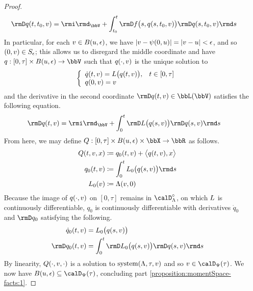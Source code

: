 \begin{proof}
\begin{align*}
    \Der q(t,t_0,\vecVar) 
    &= \id_\vecSpace + \int_{t_0}^t \Der f\big(s, q(s,t_0,\vecVar) \big) \Der q(s, t_0, \vecVar) \rmd s
  \end{align*}
  In particular, for each $v \in B(u, \epsilon)$, we have $|v - \psi(0,u)| = |v - u| < \epsilon$, and so $(0,v) \in S_\epsilon$; this allows us to disregard the middle coordinate and have $q: [0,\tau] \times B(\momentVar,\epsilon) \rightarrow \vecSpace$ such that $q(\cdot,v)$ is the unique solution to 
  \begin{equation*}
    \left\{\begin{array}{ll}
      \dot q(t, v) = L\big(q(t, v)\big), & t \in [0,\tau] \\
      q(0, v) = v
    \end{array}\right.
  \end{equation*}
  and the derivative in the second coordinate $\Der q(t,\vecVar) \in \bbL(\vecSpace)$ satisfies the following equation.
  \begin{align*}
    \Der q(t,\vecVar) &= \id_\vecSpace + \int_0^t \Der\odePart\big(q(s,\vecVar)\big)\Der q(s, \vecVar) \rmd s
  \end{align*}
  From here, we may define $Q: [0,\tau] \times B(\momentVar,\epsilon) \times \stateSpace \rightarrow \bbR$ as follows.
  \begin{align*}
    Q(t,\vecVar,\stateVar) &\defeq q_0(t,\vecVar) + \bprj{q(t,\vecVar)}{\stateVar} \\
    q_0(t,\vecVar) &\defeq \int_0^t \odePart_0\big(q(s,\vecVar)\big) \rmd s \\
    \odePart_0(\vecVar) &\defeq \ode(\vecVar, 0)
  \end{align*}
  Because the image of $q(\cdot, v)$ on $[0,\tau]$ remains in $\odeSpace^\circ$, on which $L$ is continuously differentiable, $q_0$ is continuously differentiable with derivatives $\dot q_0$ and $\Der q_0$ satisfying the following.
  \begin{align*}
    \dot q_0(t,\vecVar) &= \odePart_0\big(q(s,\vecVar)\big) \\
    \Der q_0(t, \vecVar) &= \int_0^t \Der\odePart_0\big( q(s, \vecVar) \big) \Der q(s, \vecVar) \rmd s
  \end{align*}
  By linearity, $Q(\cdot,v,\cdot)$ is a solution to $\operatorname{system}(\Lambda, \tau, v)$ and so $\vecVar \in \momentSpace(\tau)$.
  We now have $B(\momentVar,\epsilon) \subseteq \momentSpace(\tau)$, concluding part \ref{proposition:momentSpace-facts:1}.

\end{proof}
